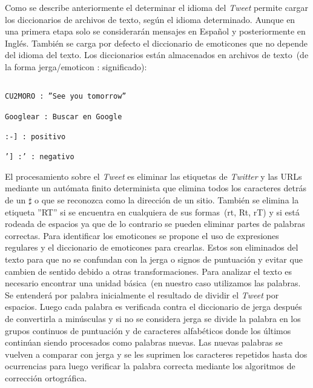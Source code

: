 Como se describe anteriormente el determinar el idioma del \emph{Tweet} permite cargar los diccionarios de
archivos de texto, según el idioma determinado. Aunque en una primera etapa solo se considerarán
mensajes en Español y posteriormente en Inglés. También se carga por defecto el diccionario de emoticones
que no depende del idioma del texto. Los diccionarios están almacenados en archivos de texto~(de la forma
jerga/emoticon : significado):

\begin{verbatim}

CU2MORO : ”See you tomorrow”

Googlear : Buscar en Google

:-] : positivo

’] :’ : negativo
\end{verbatim}

El procesamiento sobre el \emph{Tweet} es eliminar las etiquetas de \emph{Twitter} y las URLs mediante un autómata
finito determinista que elimina todos los caracteres detrás de un $\sharp$ o que se reconozca como
la dirección de un sitio. También se elimina la etiqueta ”RT” si se encuentra en cualquiera de sus
formas~(rt, Rt, rT) y si está rodeada de espacios ya que de lo contrario se pueden eliminar partes de
palabras correctas.
Para identificar los emoticones se propone el uso de expresiones regulares y el diccionario de emoticones
para crearlas. Estos son eliminados del texto para que no se confundan con la jerga o signos de
puntuación y evitar que cambien de sentido debido a otras transformaciones.
Para analizar el texto es necesario encontrar una unidad básica~(en nuestro caso utilizamos las palabras. 
Se entenderá por palabra inicialmente el resultado de dividir el \emph{Tweet} por espacios. Luego cada
palabra es verificada contra el diccionario de jerga después de convertirla a minúsculas y si no se considera
jerga se divide la palabra en los grupos continuos de puntuación y de caracteres alfabéticos donde
los últimos continúan siendo procesados como palabras nuevas.
Las nuevas palabras se vuelven a comparar con jerga y se les suprimen los caracteres repetidos hasta
dos ocurrencias para luego verificar la palabra correcta mediante los algoritmos de corrección ortográfica.


